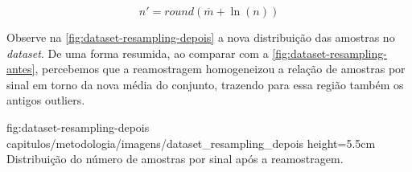 \begin{equation}
    \label{eqn:resampling-target}
    n' = round( \overline{m} + \ln(n) )
\end{equation}


Observe na \autoref{fig:dataset-resampling-depois} a nova distribuição das amostras no \textit{dataset}. De uma forma resumida, ao comparar com a \autoref{fig:dataset-resampling-antes}, percebemos que a reamostragem homogeneizou a relação de amostras por sinal em torno da nova média do conjunto, trazendo para essa região também os antigos outliers.


\figura
{fig:dataset-resampling-depois} %
{capitulos/metodologia/imagens/dataset_resampling_depois} %
{height=5.5cm} %
{Distribuição do número de amostras por sinal após a reamostragem.} %
{} %






